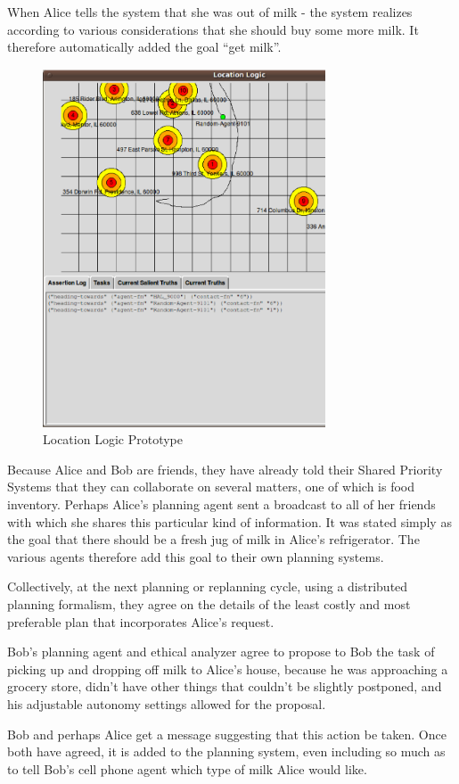 \documentclass[letterpaper]{article}
\begin{document}
When Alice tells the system that she was out of milk - the system
realizes according to various considerations that she should buy some
more milk.  It therefore automatically added the goal ``get milk''.

\begin{figure}[h!]
  \centering
  \includegraphics[width=84mm]{images/ps/location-logic.ps}
  \caption{Location Logic Prototype}
\end{figure}

Because Alice and Bob are friends, they have already told their Shared
Priority Systems that they can collaborate on several matters, one of
which is food inventory.  Perhaps Alice's planning agent sent a
broadcast to all of her friends with which she shares this particular
kind of information.  It was stated simply as the goal that there
should be a fresh jug of milk in Alice's refrigerator.  The various
agents therefore add this goal to their own planning systems.

Collectively, at the next planning or replanning cycle, using a
distributed planning formalism, they agree on the details of the least
costly and most preferable plan that incorporates Alice's request.

Bob's planning agent and ethical analyzer agree to propose to Bob the
task of picking up and dropping off milk to Alice's house, because he
was approaching a grocery store, didn't have other things that
couldn't be slightly postponed, and his adjustable autonomy settings
allowed for the proposal.

Bob and perhaps Alice get a message suggesting that this action be
taken.  Once both have agreed, it is added to the planning system,
even including so much as to tell Bob's cell phone agent which type of
milk Alice would like.
\end{document}
